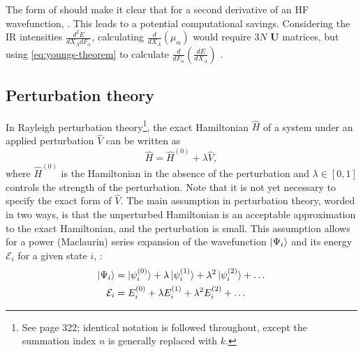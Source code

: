 \documentclass[%
class = book,%
crop = false,%
float = true,%
multi = true,%
preview = false,%
]{standalone}
\begin{document}
The form of  should make it clear that for a second derivative of an HF wavefunction, . This leads to a potential computational savings. Considering the IR intensities \(\frac{d^{2}E}{dX_{A}dF_{\alpha}}\), calculating \(\frac{d}{d X_{A}} \left(\mu_{\alpha}\right)\) would require \(3N\) \(\mathbf{U}\) matrices, but using \eqref{eq:youngs-theorem} to calculate \(\frac{d}{d F_{\alpha}} \left(\frac{d E}{d X_{A}}\right)\) .

\subsection{Perturbation theory}
\label{ssec:perturbation-theory}

In Rayleigh\textendash{}\schrod{} perturbation theory\footnote{See \szabo{}\cite{szabo1989modern} page 322; identical notation is followed throughout, except the summation index \(n\) is generally replaced with \(k\).}, the exact Hamiltonian \(\hat{H}\) of a system under an applied perturbation \(\hat{V}\) can be written as
\begin{equation}
  \label{eq:perturbed-hamiltonian}
  \hat{H} = \hat{H}^{(0)} + \lambda\hat{V},
\end{equation}
where \(\hat{H}^{(0)}\) is the Hamiltonian in the absence of the perturbation and \(\lambda \in [0,1]\) controls the strength of the perturbation. Note that it is not yet necessary to specify the exact form of \(\hat{V}\). The main assumption in perturbation theory, worded in two ways, is that the unperturbed Hamiltonian is an acceptable approximation to the exact Hamiltonian, and the perturbation is small. This assumption allows for a power (Maclaurin) series expansion of the wavefunction \(\ket{\Psi_{i}}\) and its energy \(\mathcal{E}_{i}\) for a given state \(i\), : 
\begin{align}
  \label{eq:expansion-wavefunction}
  \ket{\Psi_{i}} &= \ket{\psi_{i}^{(0)}} + \lambda\ket{\psi_{i}^{(1)}} + \lambda^{2}\ket{\psi_{i}^{(2)}} + \dots \\
  \label{eq:expansion-energy}
  \mathcal{E}_{i} &= E_{i}^{(0)} + \lambda E_{i}^{(1)} + \lambda^{2} E_{i}^{(2)} + \dots
\end{align}
\end{document}
